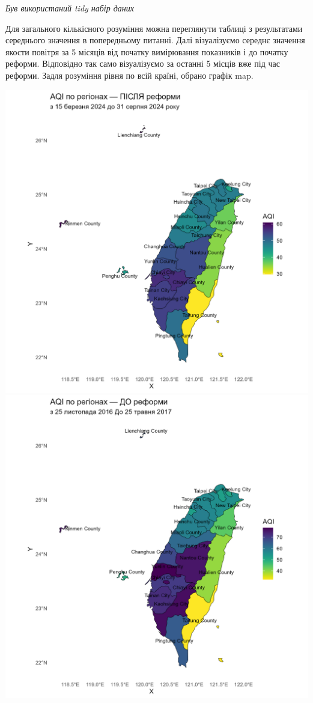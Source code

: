 \documentclass{article}
\begin{document}
\begin{enumerate}
    \quad \textit{Був використаний tidy набір даних}

    Для загального кількісного розуміння можна переглянути таблиці з результатами середнього значення в попередньому питанні. 
    Далі візуалізуємо середнє значення якости повітря за 5 місяців від початку вимірювання показників і до початку реформи. Відповідно так само візуалізуємо за останні 5 місців вже під час реформи. 
    Задля розуміння рівня по всій країні, обрано графік map. 
    
    \begin{center}
    \includegraphics[width=6in]{plots/question5/map_after_reform.png}
    \includegraphics[width=6in]{plots/question5/map_before_reform.png}

\end{center}
\end{enumerate}
\end{document}
